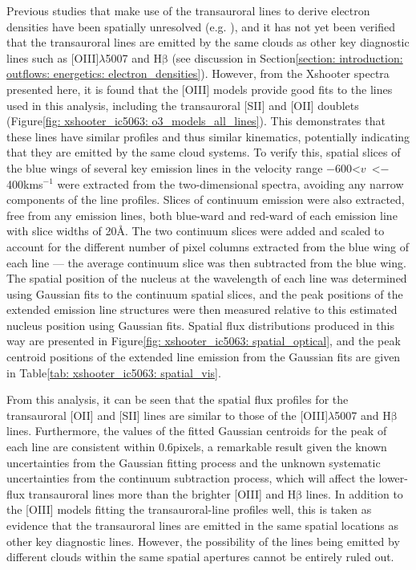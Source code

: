 Previous studies that make use of the transauroral lines to derive electron densities have been spatially unresolved (e.g. \citealt{Holt2011, Rose2018, Santoro2018, Spence2018, Santoro2020, Davies2020}), and it has not yet been verified that the transauroral lines are emitted by the same clouds as other key diagnostic lines such as [OIII]$\lambda$5007 and H$\mathrm{\beta}$ (see discussion in Section\;\ref{section: introduction: outflows: energetics: electron_densities}). However, from the Xshooter spectra presented here, it is found that the [OIII] models provide good fits to the lines used in this analysis, including the transauroral [SII] and [OII] doublets (Figure\;\ref{fig: xshooter_ic5063: o3_models_all_lines}). This demonstrates that these lines have similar profiles and thus similar kinematics, potentially indicating that they are emitted by the same cloud systems. To verify this, spatial slices of the blue wings of several key emission lines in the velocity range \mbox{$-$600\;\textless\;$v$ \;\textless\;$-$400\;km\;s$^{-1}$} were extracted from the two-dimensional spectra, avoiding any narrow components of the line profiles. Slices of continuum emission were also extracted, free from any emission lines, both blue-ward and red-ward of each emission line with slice widths of 20\;\AA. The two continuum slices were added and scaled to account for the different number of pixel columns extracted from the blue wing of each line --- the average continuum slice was then subtracted from the blue wing. The spatial position of the nucleus at the wavelength of each line was determined using Gaussian fits to the continuum spatial slices, and the peak positions of the extended emission line structures were then measured relative to this estimated nucleus position using Gaussian fits. Spatial flux distributions produced in this way are presented in Figure\;\ref{fig: xshooter_ic5063: spatial_optical}, and the peak centroid positions of the extended line emission from the Gaussian fits are given in Table\;\ref{tab: xshooter_ic5063: spatial_vis}.

From this analysis, it can be seen that the spatial flux profiles for the transauroral [OII] and [SII] lines are similar to those of the [OIII]$\lambda$5007 and H$\mathrm{\beta}$ lines. Furthermore, the values of the fitted Gaussian centroids for the peak of each line are consistent within 0.6\;pixels, a remarkable result given the known uncertainties from the Gaussian fitting process and the unknown systematic uncertainties from the continuum subtraction process, which will affect the lower-flux transauroral lines more than the brighter [OIII] and H$\mathrm{\beta}$ lines. In addition to the [OIII] models fitting the transauroral-line profiles well, this is taken as evidence that the transauroral lines are emitted in the same spatial locations as other key diagnostic lines. However, the possibility of the lines being emitted by different clouds within the same spatial apertures cannot be entirely ruled out.

